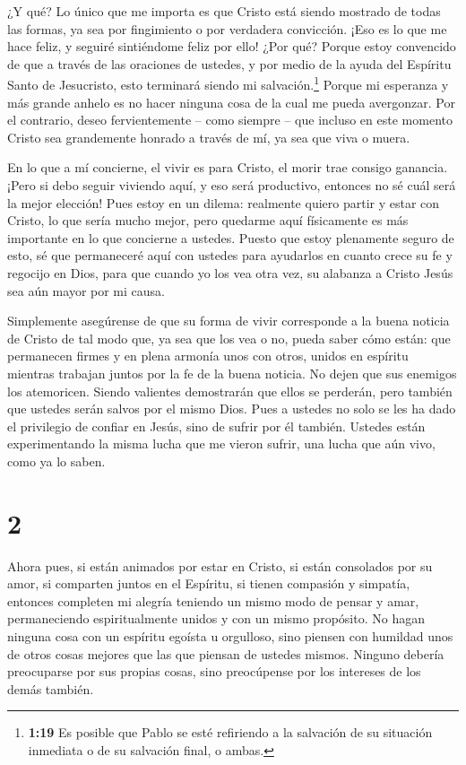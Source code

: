  ¿Y qué? Lo único que me importa es que Cristo está siendo
mostrado de todas las formas, ya sea por fingimiento o por verdadera
convicción. ¡Eso es lo que me hace feliz, y seguiré sintiéndome feliz
por ello!  ¿Por qué? Porque estoy convencido de que a
través de las oraciones de ustedes, y por medio de la ayuda del Espíritu
Santo de Jesucristo, esto terminará siendo mi salvación.\footnote{\textbf{1:19}
  Es posible que Pablo se esté refiriendo a la salvación de su situación
  inmediata o de su salvación final, o ambas.}  Porque mi
esperanza y más grande anhelo es no hacer ninguna cosa de la cual me
pueda avergonzar. Por el contrario, deseo fervientemente -- como siempre
-- que incluso en este momento Cristo sea grandemente honrado a través
de mí, ya sea que viva o muera.

 En lo que a mí concierne, el vivir es para Cristo, el
morir trae consigo ganancia.  ¡Pero si debo seguir viviendo
aquí, y eso será productivo, entonces no sé cuál será la mejor elección!
 Pues estoy en un dilema: realmente quiero partir y estar
con Cristo, lo que sería mucho mejor,  pero quedarme aquí
físicamente es más importante en lo que concierne a ustedes.
 Puesto que estoy plenamente seguro de esto, sé que
permaneceré aquí con ustedes para ayudarlos en cuanto crece su fe y
regocijo en Dios,  para que cuando yo los vea otra vez, su
alabanza a Cristo Jesús sea aún mayor por mi causa.

 Simplemente asegúrense de que su forma de vivir
corresponde a la buena noticia de Cristo de tal modo que, ya sea que los
vea o no, pueda saber cómo están: que permanecen firmes y en plena
armonía unos con otros, unidos en espíritu mientras trabajan juntos por
la fe de la buena noticia.  No dejen que sus enemigos los
atemoricen. Siendo valientes demostrarán que ellos se perderán, pero
también que ustedes serán salvos por el mismo Dios.  Pues a
ustedes no solo se les ha dado el privilegio de confiar en Jesús, sino
de sufrir por él también.  Ustedes están experimentando la
misma lucha que me vieron sufrir, una lucha que aún vivo, como ya lo
saben.

\hypertarget{section-1}{%
\section{2}\label{section-1}}

 Ahora pues, si están animados por estar en Cristo, si están
consolados por su amor, si comparten juntos en el Espíritu, si tienen
compasión y simpatía,  entonces completen mi alegría
teniendo un mismo modo de pensar y amar, permaneciendo espiritualmente
unidos y con un mismo propósito.  No hagan ninguna cosa con
un espíritu egoísta u orgulloso, sino piensen con humildad unos de otros
cosas mejores que las que piensan de ustedes mismos. 
Ninguno debería preocuparse por sus propias cosas, sino preocúpense por
los intereses de los demás también.

